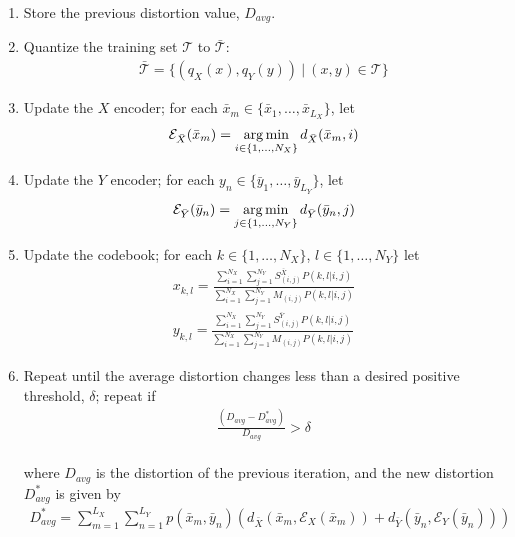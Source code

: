 \begin{enumerate}
    \item Store the previous distortion value, $D_{avg}$.
    \item Quantize the training set $\mathcal T$ to $\mathcal{\bar T}$:
    \begin{align}
        \mathcal{\bar T}=\{(q_X(x),q_Y(y))\ |\ (x,y)\in \mathcal T\}
    \end{align}
    \item Update the $X$ encoder; for each $\bar x_m\in \{\bar x_1,\ldots,\bar x_{L_X}\}$, let
    \begin{align}
        \mathcal E_{\bar X}(\bar x_m)=\operatorname*{arg\,min}_{i\in\{1,\ldots,N_X\}}d_{\bar X}(\bar x_m,i)
    \end{align}
    \item Update the $Y$ encoder; for each $y_n\in \{\bar y_1,\ldots,\bar y_{L_Y}\}$, let
    \begin{align}
        \mathcal E_{\bar Y}(\bar y_n)=\operatorname*{arg\,min}_{j\in\{1,\ldots,N_Y\}}d_{\bar Y}(\bar y_n,j)
    \end{align}
    \item Update the codebook; for each $k\in\{1,\ldots,N_X\}$, $l\in\{1,\ldots,N_Y\}$ let
    \begin{align}
    x_{k,l} = 
        \frac{\sum_{i=1}^{N_X} \sum_{j=1}^{N_Y}
        S_{(i,j)}^{\bar X} P(k,l|i,j)}
        {\sum_{i=1}^{N_X} \sum_{j=1}^{N_Y}
        M_{(i,j)} P(k,l|i,j)}\\
    y_{k,l} = 
        \frac{\sum_{i=1}^{N_X} \sum_{j=1}^{N_Y}
        S_{(i,j)}^{\bar Y} P(k,l|i,j)}
        {\sum_{i=1}^{N_X} \sum_{j=1}^{N_Y}
        M_{(i,j)} P(k,l|i,j)}
    \end{align}
    \item Repeat until the average distortion changes less than a desired positive threshold, $\delta$; repeat if
    \begin{align}
        \frac
        {(D_{avg} - D^*_{avg})}
        {D_{avg}}
        > \delta
    \end{align}
    \\
    where $D_{avg}$ is the distortion of the previous iteration, and the new distortion $D^*_{avg}$ is given by
    \begin{align}
        D^*_{avg}=\sum_{m=1}^{L_X}\sum_{n=1}^{L_Y}p(\bar x_m,\bar y_n)\left(d_{\bar X}(\bar x_m,\mathcal E_X(\bar x_m))+d_{\bar Y}(\bar y_n,\mathcal E_Y(\bar y_n))\right)
    \end{align}
\end{enumerate}

